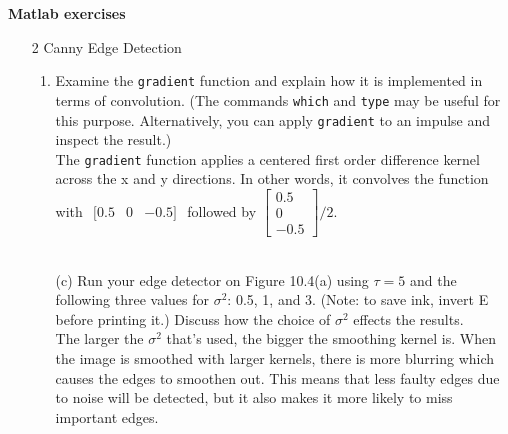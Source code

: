 \documentclass[10pt,letterpaper,oneside,onecolumn,leqno,fleqn]{article}
\begin{document}
  \pagebreak 
  \textbf{Matlab exercises}
  \begin{enumerate}
    \item[2]
      Canny Edge Detection
      \begin{enumerate}
        \item
        Examine the \texttt{gradient} function and explain how it is
        implemented in terms of convolution. (The commands \texttt{which} and
        \texttt{type} may be useful for this purpose. Alternatively, you can
        apply \texttt{gradient} to an impulse and inspect the result.) \\
        \linebreak \linebreak
        The \texttt{gradient} function applies a centered first order
        difference kernel across the x and y directions. In other words, it
        convolves the function with $ \begin{array}{rrr} [0.5 & 0 & -0.5]
        \end{array} $ followed by $ \left[ \begin{array}{c} 0.5 \\ 0 \\ -0.5
        \end{array} \right]/2 $. \\ \\

        \bigskip \bigskip
        \item[(c)]
          Run your edge detector on Figure 10.4(a) using $ \tau = 5 $ and the
          following three values for $ \sigma^2 $: 0.5, 1, and 3. (Note: to
          save ink, invert E before printing it.) Discuss how the choice of
          $ \sigma^2 $ effects the results. \\
          \linebreak \linebreak
          The larger the $ \sigma^2 $ that's used, the bigger the smoothing
          kernel is. When the image is smoothed with larger kernels, there is
          more blurring which causes the edges to smoothen out. This means that
          less faulty edges due to noise will be detected, but it also makes it
          more likely to miss important edges.
      \end{enumerate}

    \pagebreak
  \end{enumerate}
\end{document}
